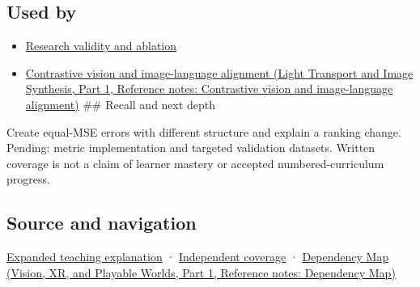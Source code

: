 \subsection{Used by}\label{appendix-b2c1846508bf-used-by}

\hypertarget{appendix-b2c1846508bf-used-by}{}

\begin{itemize}
\item
  \hyperref[appendix-65788587ef78]{Research validity and ablation}
\item
  \href{../04-Light-Transport-and-Image-Synthesis-P01/main.pdf\#appendix-772f1fd96148}{Contrastive vision and image-language alignment (Light Transport and Image Synthesis, Part 1, Reference notes: Contrastive vision and image-language alignment)} \#\# Recall and next depth
\end{itemize}

Create equal-MSE errors with different structure and explain a ranking change. Pending: metric implementation and targeted validation datasets. Written coverage is not a claim of learner mastery or accepted numbered-curriculum progress.

\subsection{Source and navigation}\label{appendix-b2c1846508bf-source-and-navigation}

\hypertarget{appendix-b2c1846508bf-source-and-navigation}{}

\hyperref[04-visual-computing-ii-ch042-quality-numbers-need-a-question-they-can-actually-answer]{Expanded teaching explanation} · \hyperref[appendix-fd090d982a15-xr01---independent-seeing-and-representation-source]{Independent coverage} · \href{../07-Vision-XR-and-Playable-Worlds-P01/main.pdf\#appendix-4ad47bdd269a}{Dependency Map (Vision, XR, and Playable Worlds, Part 1, Reference notes: Dependency Map)}
